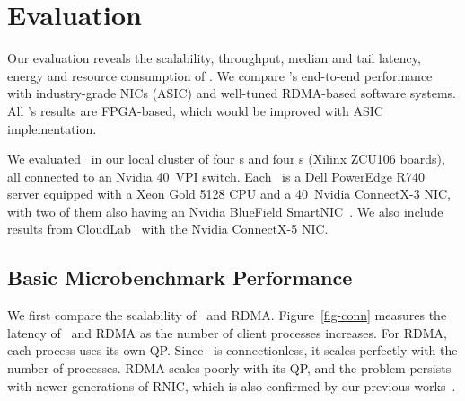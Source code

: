 % 
% 


\section{Evaluation}
\label{sec:results}


Our evaluation reveals the scalability, throughput, median and tail latency, energy and resource consumption of \sys.
We compare \sys's end-to-end performance with industry-grade NICs (ASIC) and well-tuned RDMA-based software systems.
All \sys's results are FPGA-based, which would be improved with ASIC implementation.

We evaluated \sys\ in our local cluster of four \CN{}s and four \MN{}s (Xilinx ZCU106 boards),
all connected to an Nvidia 40\Gbps\ VPI switch.
Each \CN\ is a Dell PowerEdge R740 server equipped with a Xeon Gold 5128 CPU and a 40\Gbps\ Nvidia ConnectX-3 NIC,
with two of them also having an Nvidia BlueField SmartNIC~\cite{BlueField}.
We also include results from CloudLab~\cite{CloudLab} with the Nvidia ConnectX-5 NIC.


\subsection{Basic Microbenchmark Performance}







We first compare the scalability of \sys\ and RDMA.
Figure~\ref{fig-conn} measures the latency of \sys\ and RDMA as the number of client processes increases.
For RDMA, each process uses its own QP.
Since \sys\ is connectionless, it scales perfectly with the number of processes.
RDMA scales poorly with its QP, and the problem persists with newer generations of RNIC,
which is also confirmed by our previous works~\cite{Pythia,Storm}.

